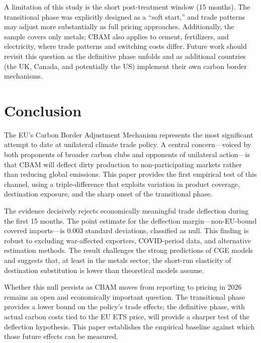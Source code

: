\documentclass[12pt]{article}
\begin{document}
A limitation of this study is the short post-treatment window (15 months). The transitional phase was explicitly designed as a ``soft start,'' and trade patterns may adjust more substantially as full pricing approaches. Additionally, the sample covers only metals; CBAM also applies to cement, fertilizers, and electricity, where trade patterns and switching costs differ. Future work should revisit this question as the definitive phase unfolds and as additional countries (the UK, Canada, and potentially the US) implement their own carbon border mechanisms.

\section{Conclusion}

The EU's Carbon Border Adjustment Mechanism represents the most significant attempt to date at unilateral climate trade policy. A central concern---voiced by both proponents of broader carbon clubs and opponents of unilateral action---is that CBAM will deflect dirty production to non-participating markets rather than reducing global emissions. This paper provides the first empirical test of this channel, using a triple-difference that exploits variation in product coverage, destination exposure, and the sharp onset of the transitional phase.

The evidence decisively rejects economically meaningful trade deflection during the first 15 months. The point estimate for the deflection margin---non-EU-bound covered imports---is 0.003 standard deviations, classified as null. This finding is robust to excluding war-affected exporters, COVID-period data, and alternative estimation methods. The result challenges the strong predictions of CGE models and suggests that, at least in the metals sector, the short-run elasticity of destination substitution is lower than theoretical models assume.

Whether this null persists as CBAM moves from reporting to pricing in 2026 remains an open and economically important question. The transitional phase provides a lower bound on the policy's trade effects; the definitive phase, with actual carbon costs tied to the EU ETS price, will provide a sharper test of the deflection hypothesis. This paper establishes the empirical baseline against which those future effects can be measured.

\label{apep_main_text_end}

\newpage
\singlespacing
\end{document}
